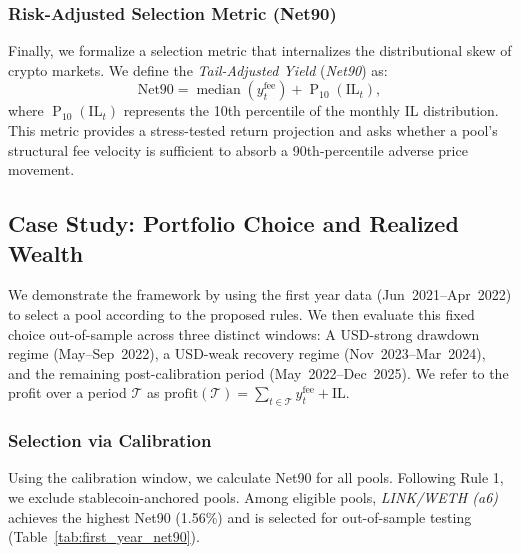 \documentclass[journal]{IEEEtran}
\begin{document}
\subsubsection{Risk-Adjusted Selection Metric (Net90)}
Finally, we formalize a selection metric that internalizes the distributional skew of crypto markets. We define the \textit{Tail-Adjusted Yield} (\textit{Net90}) as:
\begin{equation}
\label{eq:net90}
\text{Net90}
= \operatorname{median}\!\left(y^{\text{fee}}_{t}\right)
+ \operatorname{P}_{10}\!\left(\mathrm{IL}_{t}\right),
\end{equation}
where $\operatorname{P}_{10}(\mathrm{IL}_t)$ represents the 10th percentile of the monthly IL distribution. 
This metric provides a stress-tested return projection and asks whether a pool's structural fee velocity is sufficient to absorb a 90th-percentile adverse price movement.


\subsection{Case Study: Portfolio Choice and Realized Wealth}
\label{sec:case_study}
We demonstrate the framework by using the first year data (Jun~2021--Apr~2022) to select a pool according to the proposed rules. 
We then evaluate this fixed choice out-of-sample across three distinct windows: A USD-strong drawdown regime (May--Sep~2022), a USD-weak recovery regime (Nov~2023--Mar~2024), and the remaining post-calibration period (May~2022--Dec~2025). 
We refer to the profit over a period $\mathcal{T}$ as
\(
\mathrm{profit}(\mathcal{T}) = \sum_{t\in\mathcal{T}} y^{\text{fee}}_t + \mathrm{IL}.
\)

\subsubsection{Selection via Calibration}
Using the calibration window, we calculate Net90 for all pools. 
Following Rule 1, we exclude stablecoin-anchored pools. Among eligible pools, \textit{LINK/WETH (a6)} achieves the highest Net90 (1.56\%) and is selected for out-of-sample testing (Table~\ref{tab:first_year_net90}).
\end{document}
